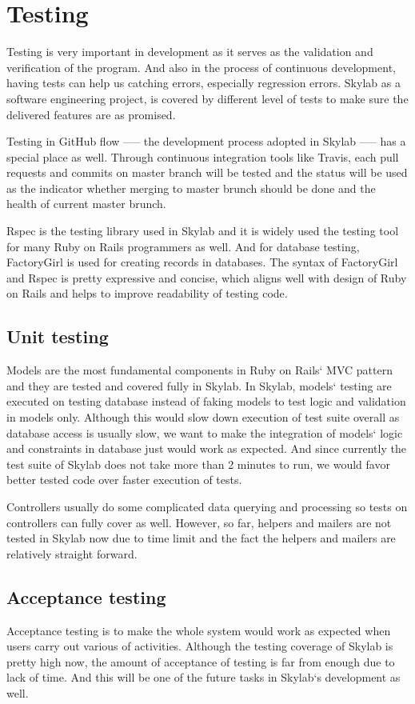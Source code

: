 \chapter{Testing} \label{testing}

Testing is very important in development as it serves as the validation and verification of the program\cite{citationtesting}. And also in the process of continuous development, having tests can help us catching errors, especially regression errors. Skylab as a software engineering project, is covered by different level of tests to make sure the delivered features are as promised.

Testing in GitHub flow —-- the development process adopted in Skylab —-- has a special place as well. Through continuous integration tools like Travis, each pull requests and commits on master branch will be tested and the status will be used as the indicator whether merging to master brunch should be done and the health of current master brunch.

Rspec is the testing library used in Skylab and it is widely used the testing tool for many Ruby on Rails programmers as well\cite{citationrspec}. And for database testing, FactoryGirl is used for creating records in databases. The syntax of FactoryGirl and Rspec is pretty expressive and concise, which aligns well with design of Ruby on Rails and helps to improve readability of testing code.

\section{Unit testing} \label{unittesting}

Models are the most fundamental components in Ruby on Rails` MVC pattern and they are tested and covered fully in Skylab. In Skylab, models` testing are executed on testing database instead of faking models to test logic and validation in models only. Although this would slow down execution of test suite overall as database access is usually slow, we want to make the integration of models` logic and constraints in database just would work as expected. And since currently the test suite of Skylab does not take more than 2 minutes to run, we would favor better tested code over faster execution of tests.

Controllers usually do some complicated data querying and processing so tests on controllers can fully cover as well. However, so far, helpers and mailers are not tested in Skylab now due to time limit and the fact the helpers and mailers are relatively straight forward.

\section{Acceptance testing} \label{acceptancetesting}

Acceptance testing is to make the whole system would work as expected when users carry out various of activities. Although the testing coverage of Skylab is pretty high now, the amount of acceptance of testing is far from enough due to lack of time. And this will be one of the future tasks in Skylab`s development as well.
